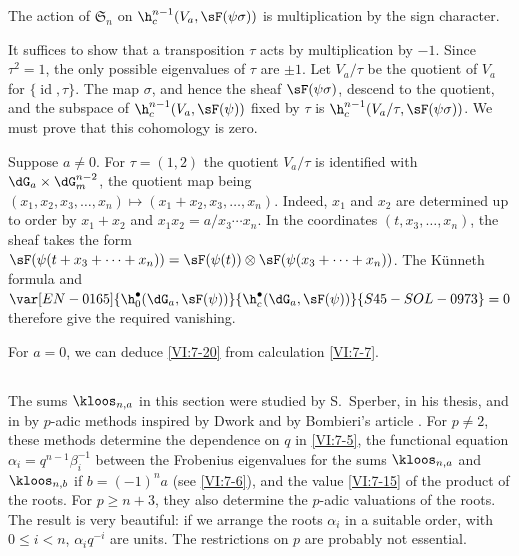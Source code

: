 \begin{proposition_}\label{VI:7-20}
The action of $\mathfrak{S}_n$ on $\h_c^{n-1}(V_a,\sF(\psi\sigma))$ is multiplication 
by the sign character. 
\end{proposition_}

It suffices to show that a transposition $\tau$ acts by multiplication 
by $-1$. Since $\tau^2=1$, the only possible eigenvalues of $\tau$ are 
$\pm 1$. Let $V_a/\tau$ be the quotient of $V_a$ for 
$\{\operatorname{id},\tau\}$. The map $\sigma$, and hence the sheaf 
$\sF(\psi\sigma)$, descend to the quotient, and the subspace of 
  $\h_c^{n-1}(V_a,\sF(\psi))$ fixed by 
$\tau$ is $\h_c^{n-1}(V_a/\tau,\sF(\psi\sigma))$. We must prove that 
this cohomology is zero. 

Suppose $a\ne 0$. For $\tau=(1,2)$ the quotient $V_a/\tau$ is identified 
with $\dG_a\times \dG_m^{n-2}$, the quotient map being 
$(x_1,x_2,x_3,\dots,x_n)\mapsto (x_1+x_2,x_3,\dots,x_n)$. Indeed, $x_1$ and 
$x_2$ are determined 
up to order by $x_1+x_2$ and 
$x_1x_2 = a/x_3\dotsm x_n$. In the coordinates $(t,x_3,\dots,x_n)$, the 
sheaf takes the form 
$\sF(\psi(t+x_3+\cdots + x_n)) = \sF(\psi(t))\otimes \sF(\psi(x_3+\cdots + x_n))$. 
  The K\"unneth formula and $\var[EN-0165]{\h_0^\bullet(\dG_a,\sF(\psi))}{\h_c^\bullet(\dG_a,\sF(\psi))}{S45-SOL-0973} = 0$ therefore give 
the required vanishing. 

For $a=0$, we can deduce \ref{VI:7-20} from calculation \ref{VI:7-7}. 





\subsection{}\label{VI:7-21}

The sums $\kloos_{n,a}$ in this section were studied by 
S.\ Sperber, in his thesis, and in  by 
$p$-adic methods inspired by Dwork and by Bombieri's article . 
For $p\ne 2$, these methods determine the dependence on $q$ in \ref{VI:7-5}, 
the functional equation $\alpha_i = q^{n-1} \beta_i^{-1}$ between the 
Frobenius eigenvalues for the sums $\kloos_{n,a}$ and 
$\kloos_{n,b}$ if $b=(-1)^n a$ (see \ref{VI:7-6}), and the value \ref{VI:7-15} 
of the product of the roots. For $p\geqslant n+3$, they also determine the 
$p$-adic valuations of the roots. The result is very beautiful: if we arrange 
the roots $\alpha_i$ in a suitable order, with 
  $0\leqslant i<n$, $\alpha_i q^{-i}$ are units. The 
restrictions on $p$ are probably not essential. 











